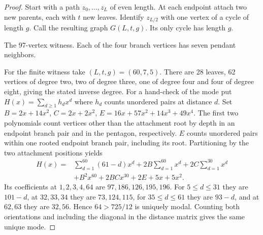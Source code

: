 \documentclass[11pt,a4paper]{article}
\theoremstyle{remark}\newtheorem*{remark}{Remark}
\begin{document}
\begin{proof}
Start with a path $z_0,\ldots,z_L$ of even length. At each endpoint attach two new parents, each with $t$ new leaves. Identify $z_{L/2}$ with one vertex of a cycle of length $g$. Call the resulting graph $G(L,t,g)$. Its only cycle has length $g$.

\begin{center}
\par\small The 97-vertex witness. Each of the four branch vertices has seven pendant neighbors.
\end{center}

For the finite witness take $(L,t,g)=(60,7,5)$. There are 28 leaves, 62 vertices of degree two, two of degree three, one of degree four and four of degree eight, giving the stated inverse degree. For a hand-check of the mode put $H(x)=\sum_{d\ge1}h_dx^d$ where $h_d$ counts unordered pairs at distance $d$. Set $B=2x+14x^2$, $C=2x+2x^2$, $E=16x+57x^2+14x^3+49x^4$. The first two polynomials count vertices other than the attachment root by depth in an endpoint branch pair and in the pentagon, respectively. $E$ counts unordered pairs within one rooted endpoint branch pair, including its root. Partitioning by the two attachment positions yields
\[
\begin{split}
 H(x)={}&\sum_{d=1}^{60}(61-d)x^d
  +2B\sum_{d=1}^{60}x^d+2C\sum_{d=1}^{30}x^d\\
 &+B^2x^{60}+2BCx^{30}+2E+5x+5x^2 .
\end{split}
\]
Its coefficients at $1,2,3,4,64$ are $97,186,126,195,196$. For $5\le d\le31$ they are $101-d$, at $32,33,34$ they are $73,124,115$, for $35\le d\le61$ they are $93-d$, and at $62,63$ they are $32,56$. Hence $64>725/12$ is uniquely modal. Counting both orientations and including the diagonal in the distance matrix gives the same unique mode.


\end{proof}
\end{document}
